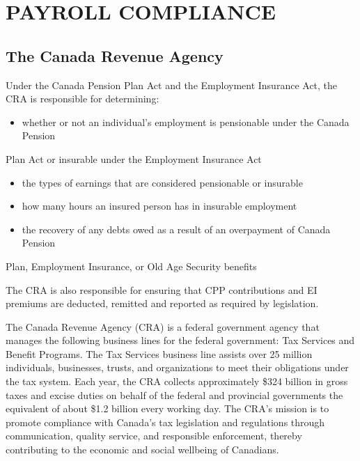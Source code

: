 \documentclass[letterpaper,10pt,english]{sphinxmanual}
\begin{document}
\chapter{PAYROLL COMPLIANCE}
\label{\detokenize{2_compliance:payroll-compliance}}\label{\detokenize{2_compliance::doc}}

\section{The Canada Revenue Agency}
\label{\detokenize{2_compliance:the-canada-revenue-agency}}
\sphinxAtStartPar
Under the Canada Pension Plan Act and the Employment Insurance Act, the CRA is
responsible for determining:
\begin{itemize}
\item {} 
\sphinxAtStartPar
whether or not an individual’s employment is pensionable under the Canada Pension

\end{itemize}

\sphinxAtStartPar
Plan Act or insurable under the Employment Insurance Act
\begin{itemize}
\item {} 
\sphinxAtStartPar
the types of earnings that are considered pensionable or insurable

\item {} 
\sphinxAtStartPar
how many hours an insured person has in insurable employment

\item {} 
\sphinxAtStartPar
the recovery of any debts owed as a result of an overpayment of Canada Pension

\end{itemize}

\sphinxAtStartPar
Plan, Employment Insurance, or Old Age Security benefits

\sphinxAtStartPar
The CRA is also responsible for ensuring that CPP contributions and EI premiums are
deducted, remitted and reported as required by legislation.

\sphinxAtStartPar
The Canada Revenue Agency (CRA) is a federal government agency that manages the
following business lines for the federal government: Tax Services and Benefit Programs.
The Tax Services business line assists over 25 million individuals, businesses, trusts, and
organizations to meet their obligations under the tax system. Each year, the CRA collects
approximately \$324 billion in gross taxes and excise duties on behalf of the federal and
provincial governments \sphinxhyphen{} the equivalent of about \$1.2 billion every working day. The CRA’s
mission is to promote compliance with Canada’s tax legislation and regulations through
communication, quality service, and responsible enforcement, thereby contributing to the
economic and social well\sphinxhyphen{}being of Canadians.
\end{document}
